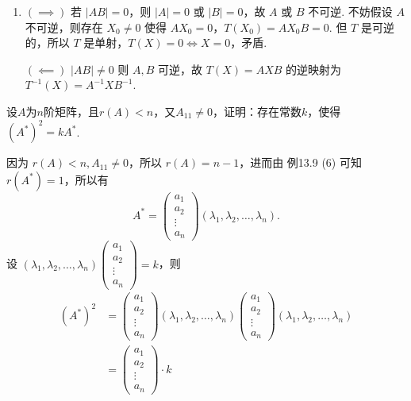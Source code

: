 \begin{exercise}
\begin{exgroup}
\begin{answer}
\begin{enumerate}
                \item $(\implies)$ 若 $\lvert AB \rvert = 0$，则 $\lvert A \rvert = 0$ 或 $\lvert B \rvert = 0$，故 $A$ 或 $B$ 不可逆. 不妨假设 $A$ 不可逆，则存在 $X_0 \neq 0$ 使得 $AX_0 = 0$，$T(X_0) = AX_0B = 0$. 但 $T$ 是可逆的，所以 $T$ 是单射，$T(X) = 0 \Leftrightarrow X = 0$，矛盾.

                      $(\impliedby)$ $\lvert AB \rvert \neq 0$ 则 $A, B$ 可逆，故 $T(X) = AXB$ 的逆映射为 $T^{-1}(X) = A^{-1}XB^{-1}$.
            \end{enumerate}
        \end{answer}

        \item 设$A$为$n$阶矩阵，且$r(A) < n$，又$A_{11} \neq 0$，证明：存在常数$k$，使得$(A^*)^2=kA^*$.
        \begin{answer}
            因为 $r(A) < n, A_{11} \neq 0$，所以 $r(A) = n-1$，进而由 {例13.9 (6)} 可知 $r(A^*) = 1$，所以有 %
            \[A^* = \begin{pmatrix} a_1 \\ a_2 \\ \vdots \\ a_n \end{pmatrix} (\lambda_1, \lambda_2, \ldots, \lambda_n).\]
            设 $(\lambda_1, \lambda_2, \ldots, \lambda_n) \begin{pmatrix} a_1 \\ a_2 \\ \vdots \\ a_n \end{pmatrix} = k$，则
            \begin{align*}
                (A^*)^2 & = \begin{pmatrix}a_1 \\ a_2 \\ \vdots \\ a_n \end{pmatrix}
                (\lambda_1, \lambda_2, \ldots, \lambda_n)
                \begin{pmatrix} a_1 \\ a_2 \\ \vdots \\ a_n \end{pmatrix}
                (\lambda_1, \lambda_2, \ldots, \lambda_n)                                     \\
                        & = \begin{pmatrix} a_1 \\ a_2 \\ \vdots \\ a_n \end{pmatrix} \cdot k

\end{align*}
\end{answer}
\end{exgroup}
\end{exercise}

